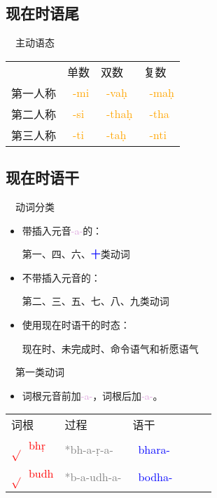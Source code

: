 \documentclass[17pt]{beamer}
\newcommand{\skt}[1]{{\sanskritfont{#1}}} %
\newcommand{\verbroot}[1]{\textcolor{red}{$\sqrt{}$#1}}
\newcommand{\sktroot}[1]{{\verbroot{\skt{#1}}}}
\newcommand{\skttransroot}[1]{{\sktroot{#1}~\textcolor{red}{#1}}}
\newcommand{\verbstem}[1]{\textcolor{blue}{#1\nobreakdash-}}
\newcommand{\sktverbstem}[1]{{\textcolor{blue}{\skt{#1\nobreakdash-}}}}
\newcommand{\skttransverbstem}[1]{{\sktverbstem{#1}~\verbstem{#1}}}
\newcommand{\wordending}[1]{\textcolor{Orange}{\nobreakdash-#1}}
\newcommand{\sktending}[1]{{\textcolor{Orange}{\skt{-#1}}}}
\newcommand{\skttransending}[1]{{\sktending{#1}~\wordending{#1}}}
\newcommand{\pratyaya}[1]{\textcolor{Plum}{#1}}
\newcommand{\notsoimportant}[1]{\textcolor{gray}{#1}}
\begin{document}
\subsection{现在时语尾}
\begin{frame}{\insertsubsection ~~主动语态}
  \small
  \centering
  \begin{tabular}{@{}llll@{}} %
    & 单数  & 双数  & 复数 \\
    第一人称 & \skttransending{mi} & \skttransending{vaḥ}  & \skttransending{maḥ}  \\
    第二人称 & \skttransending{si} & \skttransending{thaḥ} & \skttransending{tha}   \\
    第三人称 & \skttransending{ti} & \skttransending{taḥ} & \skttransending{nti}  \\
  \end{tabular}   
\end{frame}

\subsection{现在时语干}
\begin{frame}{\insertsubsection ~~动词分类}
  \begin{itemize}
    \item
      带插入元音\pratyaya{\nobreakdash-a-}的：
      
      第一、四、六、\textcolor{blue}{十}类动词
    \item
      不带插入元音的：
      
      第二、三、五、七、八、九类动词
    \item
      使用现在时语干的时态：
      
      现在时、未完成时、命令语气和祈愿语气
  \end{itemize}  
\end{frame}

\begin{frame}{\insertsubsection ~~第一类动词}
  \small
  \begin{itemize}
    \item
      词根元音前加\pratyaya{\nobreakdash-a\nobreakdash-}，词根后加\pratyaya{\nobreakdash-a\nobreakdash-}。
  \end{itemize} 

  \centering
  \begin{tabular}{@{}llllll@{}} %
    词根 & 过程 & 语干  \\
    \skttransroot{bhṛ} & \notsoimportant{*bh-a-ṛ-a-} & \skttransverbstem{bhara}  \\
    \skttransroot{budh} & \notsoimportant{*b-a-udh-a-} & \skttransverbstem{bodha}  \\
  \end{tabular}

\end{frame}
\end{document}

